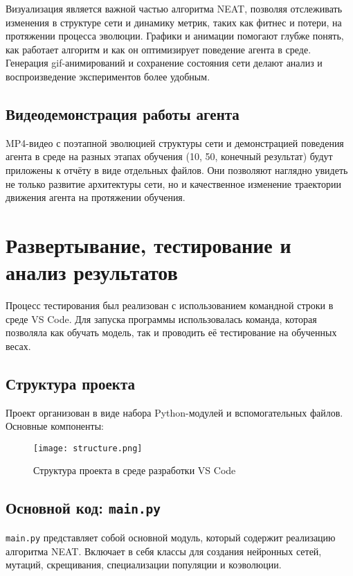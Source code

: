 \documentclass[a4paper,12pt]{article}
\begin{document}
Визуализация является важной частью алгоритма NEAT, позволяя отслеживать изменения в структуре сети и динамику метрик, таких как фитнес и потери, на протяжении процесса эволюции. Графики и анимации помогают глубже понять, как работает алгоритм и как он оптимизирует поведение агента в среде. Генерация gif-анимирований и сохранение состояния сети делают анализ и воспроизведение экспериментов более удобным.

\subsection{Видеодемонстрация работы агента}

MP4-видео с поэтапной эволюцией структуры сети и демонстрацией поведения агента в среде на разных этапах обучения (10, 50, конечный результат) будут приложены к отчёту в виде отдельных файлов. Они позволяют наглядно увидеть не только развитие архитектуры сети, но и качественное изменение траектории движения агента на протяжении обучения.

\newpage
\section{Развертывание, тестирование и анализ результатов}

Процесс тестирования был реализован с использованием командной строки в среде VS Code. Для запуска программы использовалась команда, которая позволяла как обучать модель, так и проводить её тестирование на обученных весах.

\subsection{Структура проекта}

Проект организован в виде набора Python-модулей и вспомогательных файлов. Основные компоненты:

\begin{figure}[H]
	\centering
	\texttt{[image: structure.png]}
	\caption{Структура проекта в среде разработки VS Code}
	\label{fig:struct_screenshot}
\end{figure}
\subsection{Основной код: \texttt{main.py}}

\texttt{main.py} представляет собой основной модуль, который содержит реализацию алгоритма NEAT. Включает в себя классы для создания нейронных сетей, мутаций, скрещивания, специализации популяции и коэволюции.
\end{document}
